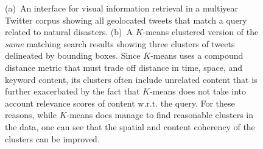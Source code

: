 \begin{figure}[t]
\begin{centering}
\hspace{0.09cm}\hspace{0.09cm}
\par\end{centering}
\caption{(a)~An interface for visual information retrieval in a multiyear Twitter corpus showing all geolocated tweets that match a query related to natural disasters.
(b)~A $K$-means clustered version of the \emph{same} matching search results showing three clusters of tweets delineated by bounding boxes.  Since $K$-means uses a compound distance metric that must trade off distance in time, space, and keyword content, its clusters often include unrelated content that is further exacerbated by the fact that $K$-means does not take into account relevance scores of content w.r.t. the query.  For these reasons, while $K$-means does manage to find reasonable clusters in the data, one can see that the spatial and content coherency of the clusters can be improved.
}
\end{figure}
